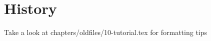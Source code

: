 \chapter{History}\label{chap:history}

Take a look at chapters/oldfiles/10-tutorial.tex for formatting tips
